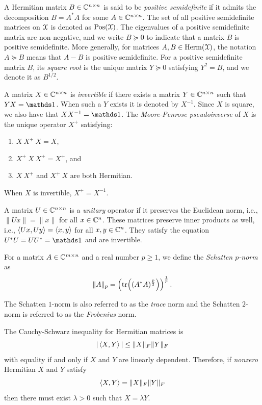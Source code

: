 A Hermitian matrix $B \in \mathbb{C}^{n \times n}$ is said to be \emph{positive semidefinite} if it admits the decomposition $B = A^* A$ for some $A \in \mathbb{C}^{n \times n}$.
The set of all positive semidefinite matrices on $\mathcal{X}$ is denoted as $\operatorname{Pos}(\mathcal{X})$.
The eigenvalues of a positive semidefinite matrix are non-negative, and we write $B \succcurlyeq 0$ to indicate that a matrix $B$ is positive semidefinite. 
More generally, for matrices $A, B \in \operatorname{Herm}(\mathcal{X})$, the notation $A \succcurlyeq B$ means that $A-B$ is positive semidefinite.
For a positive semidefinite matrix $B$, its \emph{square root} is the unique matrix $Y \succcurlyeq 0$ satisfying $Y^2 = B$, and we denote it as $B^{1/2}$.

A matrix $X \in \mathbb{C}^{n \times n}$ is \emph{invertible} if there exists a matrix $Y \in \mathbb{C}^{n \times n}$ such that $YX = \id$.
When such a $Y$ exists it is denoted by $X^{-1}$.
Since $X$ is square, we also have that $X X^{-1} = \id$.
The \emph{Moore-Penrose pseudoinverse} of $X$ is the unique operator $X^+$ satisfying:
\begin{enumerate}
    \item $X\ X^+\ X = X$,
    \item $X^+\ X\ X^+ = X^+$, and
    \item $X\ X^+$ and $X^+\ X$ are both Hermitian.
\end{enumerate}
When $X$ is invertible, $X^+ = X^{-1}$.

A matrix $U \in \mathbb{C}^{n \times n}$ is a \emph{unitary} operator if it preserves the Euclidean norm, i.e., $\|Ux\| = \|x\|$ for all $x \in \mathbb{C}^n$.
These matrices preserve inner products as well, i.e., $\left\langle Ux, Uy \right\rangle = \left\langle x, y \right\rangle$ for all $x, y \in \mathbb{C}^n$.
They satisfy the equation $U^* U = U U^* = \id$ and are invertible.

For a matrix $A \in \mathbb{C}^{m \times n}$ and a real number $p \geq 1$, we define the \emph{Schatten $p$-norm} as
\begin{equation}
    \| A \|_p = \left( \tr((A^* A)^\frac{p}{2}) \right)^\frac{1}{p}.
\end{equation}

The Schatten $1$-norm is also referred to as the \emph{trace} norm and the Schatten $2$-norm is referred to as the \emph{Frobenius} norm.

The Cauchy-Schwarz inequality for Hermitian matrices is
\begin{equation} 
|\left\langle X, Y \right\rangle| \leq \| X \|_F \| Y \|_F 
\end{equation} 
with equality if and only if $X$ and $Y$ are linearly dependent. 
Therefore, if \emph{nonzero} Hermitian $X$ and $Y$ satisfy 
\begin{equation} 
\left\langle X, Y \right\rangle = \| X \|_F \| Y \|_F 
\end{equation} 
then there must exist $\lambda > 0$ such that $X = \lambda Y$.

